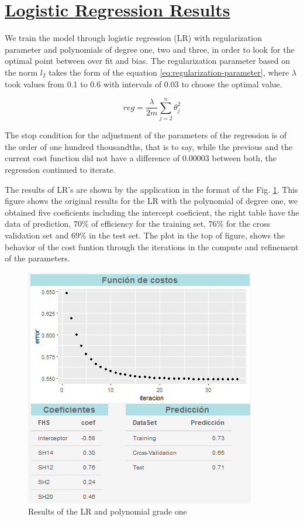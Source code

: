 \documentclass[]{book}
\begin{document}
\section{\texorpdfstring{\protect\hyperlink{LR-results}{Logistic
Regression
Results}}{Logistic Regression Results}}\label{logistic-regression-results}

We train the model through logistic regression (LR) with regularization
parameter and polynomials of degree one, two and three, in order to look
for the optimal point between over fit and bias. The regularization
parameter based on the norm \(l_2\) takes the form of the equation
\eqref{eq:regularization-parameter}, where \(\lambda\) took values from
0.1 to 0.6 with intervals of 0.03 to choose the optimal value.

\begin{equation}
  reg=\frac{\lambda}{2m}\sum_{j=2}^{n}\theta_j^2
  \label{eq:regularization-parameter}
\end{equation}

The stop condition for the adjustment of the parameters of the
regression is of the order of one hundred thousandths, that is to say,
while the previous and the current cost function did not have a
difference of 0.00003 between both, the regression continued to iterate.

The results of LR's are shown by the application in the format of the
Fig. \ref{fig:lr-poly-1}. This figure shows the original results for the
LR with the polynomial of degree one, we obtained five coeficients
including the intercept coeficient, the right table have the data of
prediction, \(70\%\) of efficiency for the training set, \(76\%\) for
the cross validation set and \(69\%\) in the test set. The plot in the
top of figure, shows the behavior of the cost funtion through the
iterations in the compute and refinement of the parameters.

\begin{figure}[H]

{\centering \includegraphics[width=0.8\linewidth]{images/lr-poly-1} 

}

\caption{Results of the LR and polynomial grade one}\label{fig:lr-poly-1}
\end{figure}
\end{document}

